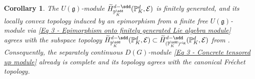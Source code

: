\documentclass[a4paper, reqno, 10pt]{amsart}
\newtheorem{corollary}[theorem]{Corollary}
\theoremstyle{definition}
\numberwithin{equation}{section}
\newcommand{\rig}{{\mathrm{rig}}}
\newcommand{\BP}{{\mathbb {P}}}
\newcommand{\CE}{{\mathcal {E}}}
\newcommand{\Fg}{{\mathfrak {g}}}
\begin{document}
\begin{corollary}\label{Cor 3 - The two topologies on the local cohomology groups agree}
	The $U(\Fg)$-module $\widetilde{H}^{d-\sdd}_{\BP_K^\sdd} (\BP_K^d, \CE)$ is finitely generated, and its locally convex topology induced by an epimorphism from a finite free $U(\Fg)$-module via \eqref{Eq 3 - Epimorphism onto finitely generated Lie algebra module} agrees with the subspace topology $\widetilde{H}^{d-\sdd}_{\BP_K^\sdd} (\BP_K^d, \CE) \subset \widetilde{H}^{d-\sdd}_{(\BP_K^{\sdd})^\rig} (\BP_K^d, \CE)$ from .
	Consequently, the separately continuous $D(G)$-module \eqref{Eq 3 - Concrete tensored up module} already is complete and its topology agrees with the canonical Fr\'echet topology.
\end{corollary}
\end{document}
